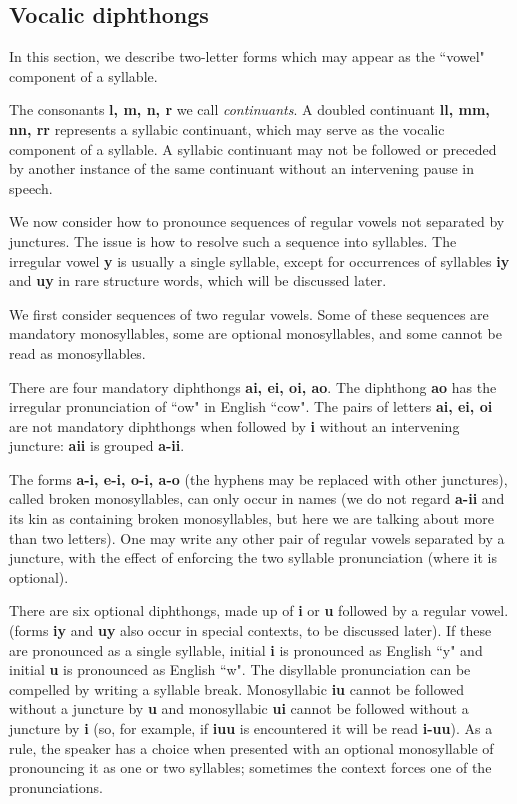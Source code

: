 \documentclass[12pt]{book}
\begin{document}
\subsection{Vocalic diphthongs}

In this section, we describe two-letter forms which may appear as the ``vowel" component of a syllable.

The consonants {\bf l, m, n, r} we call {\em continuants}.  A doubled continuant {\bf ll, mm, nn, rr} represents a syllabic continuant, which may serve as the vocalic component of a syllable.
A syllabic continuant may not be followed  or preceded by another instance of the same continuant without an intervening pause in speech.

We now consider how to pronounce sequences of regular vowels not separated by junctures.  The issue is how to resolve such a sequence into syllables.
The irregular vowel {\bf y} is usually a single syllable, except for occurrences of syllables {\bf iy} and {\bf uy} in rare structure words, which will be discussed later.

We first consider sequences of two regular vowels.  Some of these sequences are mandatory monosyllables, some are optional monosyllables, and some cannot be read as monosyllables.

There are four mandatory diphthongs {\bf ai, ei, oi, ao}.  The diphthong {\bf ao} has the irregular pronunciation of ``ow"  in English ``cow".   The pairs of letters {\bf ai, ei, oi} are not mandatory diphthongs when followed by {\bf i} without an intervening juncture:  {\bf aii} is grouped {\bf a-ii}.

The forms {\bf a-i, e-i, o-i, a-o} (the hyphens may be replaced with other junctures), called broken monosyllables, can only occur in names (we do not regard {\bf a-ii} and its kin as containing broken monosyllables, but here we are talking about more than two letters).  One may write any other pair of regular vowels separated by a juncture, with the effect of enforcing the two syllable pronunciation (where it is optional).

There are six optional diphthongs, made up of {\bf i} or {\bf u} followed by a regular vowel.  (forms {\bf iy} and {\bf uy} also occur in special contexts, to be discussed later).  If these are pronounced as a single syllable, initial {\bf i} is pronounced as English ``y" and initial {\bf u} is pronounced as English ``w".  The disyllable pronunciation can be compelled by writing
a syllable break.   Monosyllabic {\bf iu} cannot be followed without a juncture by {\bf u} and monosyllabic {\bf ui} cannot be followed without a juncture by {\bf i} (so, for example, if
{\bf iuu} is encountered it will be read {\bf i-uu}).  As a rule, the speaker has a choice when presented with an optional monosyllable of pronouncing it as one or two syllables; sometimes the context forces one of the pronunciations.
\end{document}
